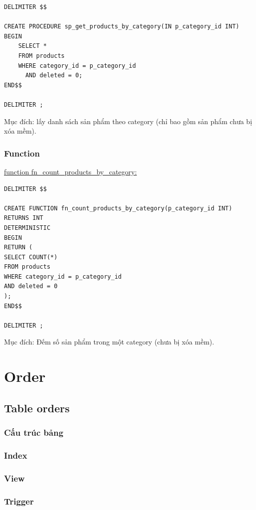 \begin{verbatim}
DELIMITER $$

CREATE PROCEDURE sp_get_products_by_category(IN p_category_id INT)
BEGIN
    SELECT *
    FROM products
    WHERE category_id = p_category_id
      AND deleted = 0;
END$$

DELIMITER ;
\end{verbatim}

Mục đích: lấy danh sách sản phẩm theo category (chỉ bao gồm sản phẩm chưa bị xóa mềm).

\subsubsection{Function}

\underline{function fn\_count\_products\_by\_category:}

\begin{verbatim}
DELIMITER $$

CREATE FUNCTION fn_count_products_by_category(p_category_id INT)
RETURNS INT
DETERMINISTIC
BEGIN
RETURN (
SELECT COUNT(*)
FROM products
WHERE category_id = p_category_id
AND deleted = 0
);
END$$

DELIMITER ;
\end{verbatim}

Mục đích: Đếm số sản phẩm trong một category (chưa bị xóa mềm).

\section{Order}

\subsection{Table orders}

\subsubsection{Cấu trúc bảng}

\subsubsection{Index}

\subsubsection{View}

\subsubsection{Trigger}

